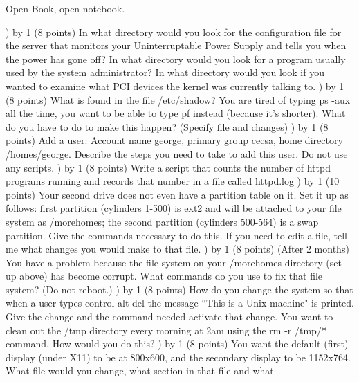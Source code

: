 
\parindent=0in
\nopagenumbers
\newcount\quesno
{}
\def\ques{\number\quesno) \advance\quesno by 1}
\def\aspace{\vskip 1.5in}

Open Book, open notebook.

\ques
(8 points)
In what directory would you look for the configuration file for the server
that monitors your Uninterruptable Power Supply and 
tells you when the power has gone off?
\vskip 0.5in
In what directory would you look for a program usually used by the system
administrator?
\vskip 0.5in
In what directory would you look if you wanted to examine what PCI devices
the kernel was currently talking to.
\vskip 0.5in
\ques
(8 points)
What is found in the file {\ltt/etc/shadow}?
\vskip 0.5in
You are tired of typing {\ltt{}ps -aux} all the time, you want to be able
to type {\ltt{}pf} instead (because it's shorter). 
What do you have to do to make this happen? (Specify file and changes)
\vskip 1.8in
\ques
(8 points)
Add a user: Account name {\ltt{}george}, primary group {\ltt{}cecsa},
home directory {\ltt{}/homes/george}.
Describe the steps you need to take to add this user.
Do not use any scripts.
\vfill\eject
\ques
(8 points)
Write a script that counts the number of {\ltt{}httpd} programs
running and records that number in a file called {\ltt{}httpd.log}
\vskip 2.8in
\ques
(10 points)
Your second drive does not even have a partition table on it.
Set it up as follows: first partition (cylinders 1-500) is ext2 and
will be attached to your file system as {\ltt{}/morehomes};
the second partition (cylinders 500-564) is a swap partition.
Give the commands necessary to do this. If you need to edit a file,
tell me what changes you would make to that file.
\vskip 3.8in
\ques
(8 points)
(After 2 months) You have a problem because the file system on your
{\ltt{}/morehomes} directory (set up above) has become corrupt.
What commands do you use to fix that file system? (Do not reboot.)
\vfill\eject
\ques
(8 points)
How do you change the system so that when a user types control-alt-del
the message ``This is a Unix machine" is printed. Give the change
and the command needed activate that change.
\vskip 1.0in
You want to clean out the {\ltt{}/tmp} directory every morning at 2am
using the {\ltt{}rm -r /tmp/*} command. How would you do this?
\vskip 2.5in
\ques
(8 points)
You want the default (first) display (under X11) to be at 800x600,
and the secondary display to be 1152x764.
What file would you change, what section in that file and what
